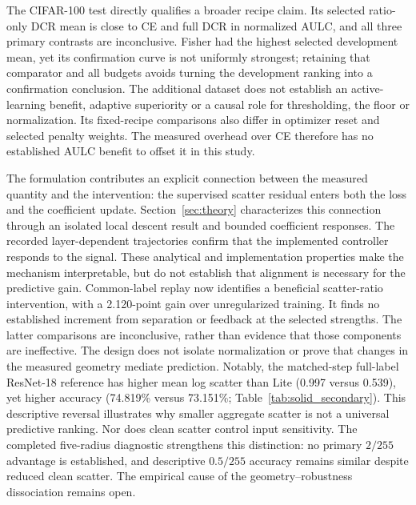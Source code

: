 \documentclass[10pt,a4paper,twocolumn]{article}
\begin{document}
The CIFAR-100 test directly qualifies a broader recipe claim. Its
selected ratio-only DCR mean is close to CE and full DCR in normalized
AULC, and all three primary contrasts are inconclusive. Fisher had the
highest selected development mean, yet its confirmation curve is not
uniformly strongest; retaining that comparator and all budgets avoids
turning the development ranking into a confirmation conclusion.
The additional dataset does not establish an active-learning benefit,
adaptive superiority or a causal role for thresholding, the floor or
normalization. Its fixed-recipe comparisons also differ in optimizer
reset and selected penalty weights. The measured overhead over CE
therefore has no established AULC benefit to offset it in this study.

The formulation contributes an explicit connection between the measured
quantity and the intervention: the supervised scatter residual enters
both the loss and the coefficient update. Section~\ref{sec:theory}
characterizes this connection through an isolated local descent result
and bounded coefficient responses. The recorded layer-dependent
trajectories confirm that the implemented controller responds to the
signal. These analytical and implementation properties make the
mechanism interpretable, but do not establish that alignment is necessary
for the predictive gain. Common-label replay now identifies a beneficial
scatter-ratio intervention, with a 2.120-point gain over unregularized
training. It finds no established increment from separation or feedback
at the selected strengths. The latter comparisons are inconclusive,
rather than evidence that those components are ineffective. The design
does not isolate normalization or prove that changes in the measured
geometry mediate prediction. Notably, the matched-step full-label
ResNet-18 reference has higher mean log scatter than Lite (0.997 versus
0.539), yet higher accuracy (74.819\% versus 73.151\%;
Table~\ref{tab:solid_secondary}). This descriptive reversal illustrates
why smaller aggregate scatter is not a universal predictive ranking.
Nor does clean scatter control input sensitivity. The completed five-radius diagnostic strengthens this distinction:
no primary $2/255$ advantage is established, and descriptive $0.5/255$
accuracy remains similar despite reduced clean scatter. The empirical
cause of the geometry--robustness dissociation remains open.
\end{document}
